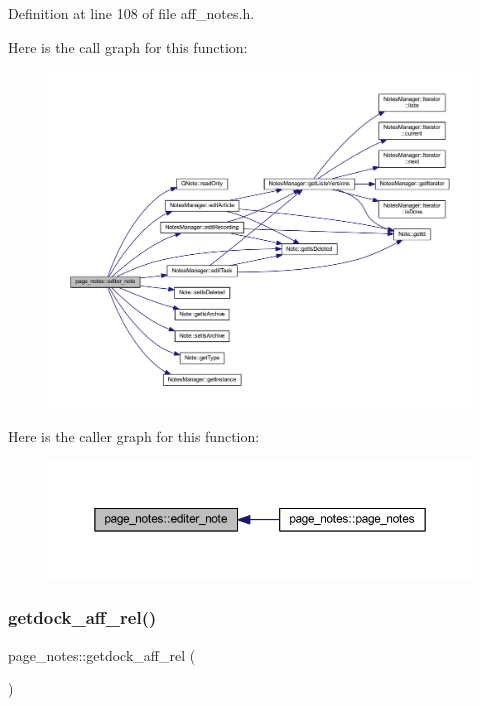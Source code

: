 Definition at line 108 of file aff\+\_\+notes.\+h.

Here is the call graph for this function\+:\nopagebreak
\begin{figure}[H]
\begin{center}
\leavevmode
\includegraphics[width=350pt]{classpage__notes_a9fd367fb577c6048353f18ad56792c1f_cgraph}
\end{center}
\end{figure}
Here is the caller graph for this function\+:\nopagebreak
\begin{figure}[H]
\begin{center}
\leavevmode
\includegraphics[width=350pt]{classpage__notes_a9fd367fb577c6048353f18ad56792c1f_icgraph}
\end{center}
\end{figure}
\mbox{\label{classpage__notes_ab1019034677a5e10b14980864abdd21e}} 
\subsubsection{\texorpdfstring{getdock\+\_\+aff\+\_\+rel()}{getdock\_aff\_rel()}}
{\footnotesize\ttfamily page\+\_\+notes\+::getdock\+\_\+aff\+\_\+rel (\begin{DoxyParamCaption}{ }\end{DoxyParamCaption})\hspace{0.3cm}{\ttfamily [inline]}}




